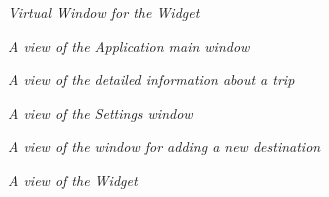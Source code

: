 \begin{figure}
 
\begin{center}

  \caption{\emph{Virtual Window for the Widget}}
  

\end{center}    
\end{figure}



\begin{figure}
 
\begin{center}

  \caption{\emph{A view of the Application main window}}
  

\end{center}    
\end{figure}

\begin{figure}
 
\begin{center}

  \caption{\emph{A view of the detailed information about a trip}}
  

\end{center}    
\end{figure}


\begin{figure}
 
\begin{center}

  \caption{\emph{A view of the Settings window}}
  

\end{center}    
\end{figure}


\begin{figure}
 
\begin{center}

  \caption{\emph{A view of the window for adding a new destination}}
  

\end{center}    
\end{figure}


\begin{figure}
 
\begin{center}

  \caption{\emph{A view of the Widget}}
  

\end{center}    
\end{figure}

